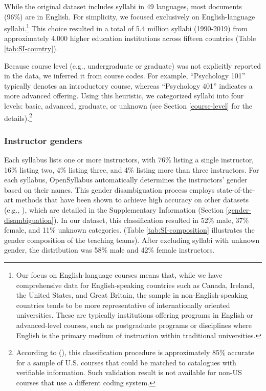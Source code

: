 \documentclass[
  british,
  11pt,
]{article}
\begin{document}
While the original dataset includes syllabi in 49 languages, most documents (96\%) are in English. For simplicity, we focused exclusively on English-language syllabi.\footnote{
  Our focus on English-language courses means that, while we have comprehensive data for English-speaking countries such as Canada, Ireland, the United States, and Great Britain, the sample in non-English-speaking countries tends to be more representative of internationally oriented universities. These are typically institutions offering programs in English or advanced-level courses, such as postgraduate programs or disciplines where English is the primary medium of instruction within traditional universities.} This choice resulted in a total of 5.4 million syllabi (1990-2019) from approximately 4,000 higher education institutions across fifteen countries (Table \ref{tab:SI-country}).

Because course level (e.g., undergraduate or graduate) was not explicitly reported in the data, we inferred it from course codes. For example, ``Psychology 101'' typically denotes an introductory course, whereas ``Psychology 401'' indicates a more advanced offering. Using this heuristic, we categorized syllabi into four levels: basic, advanced, graduate, or unknown (see Section \ref{course-level} for the details).\footnote{
  According to (), this classification procedure is approximately 85\% accurate for a sample of U.S. courses that could be matched to catalogues with verifiable information. Such validation result is not available for non-US courses that use a different coding system.}

\subsubsection{Instructor genders}\label{instructor-genders}

Each syllabus lists one or more instructors, with 76\% listing a single instructor, 16\% listing two, 4\% listing three, and 4\% listing more than three instructors. For each syllabus, OpenSyllabus automatically determines the instructors' gender based on their names. This gender disambiguation process employs state-of-the-art methods that have been shown to achieve high accuracy on other datasets (e.g., ), which are detailed in the Supplementary Information (Section \ref{gender-disambiguation}). In our dataset, this classification resulted in 52\% male, 37\% female, and 11\% unknown categories. (Table \ref{tab:SI-composition} illustrates the gender composition of the teaching teams). After excluding syllabi with unknown gender, the distribution was 58\% male and 42\% female instructors.
\end{document}
